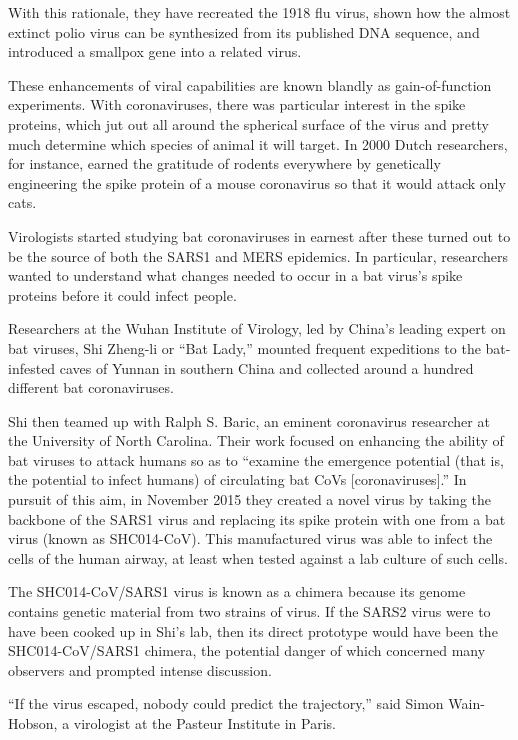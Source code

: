 \documentclass[
]{book}
\begin{document}
With this rationale, they have recreated the 1918 flu virus, shown how the almost extinct polio virus can be synthesized from its published DNA sequence, and introduced a smallpox gene into a related virus.

These enhancements of viral capabilities are known blandly as gain-of-function experiments. With coronaviruses, there was particular interest in the spike proteins, which jut out all around the spherical surface of the virus and pretty much determine which species of animal it will target. In 2000 Dutch researchers, for instance, earned the gratitude of rodents everywhere by genetically engineering the spike protein of a mouse coronavirus so that it would attack only cats.

Virologists started studying bat coronaviruses in earnest after these turned out to be the source of both the SARS1 and MERS epidemics. In particular, researchers wanted to understand what changes needed to occur in a bat virus's spike proteins before it could infect people.

Researchers at the Wuhan Institute of Virology, led by China's leading expert on bat viruses, Shi Zheng-li or ``Bat Lady,'' mounted frequent expeditions to the bat-infested caves of Yunnan in southern China and collected around a hundred different bat coronaviruses.

Shi then teamed up with Ralph S. Baric, an eminent coronavirus researcher at the University of North Carolina. Their work focused on enhancing the ability of bat viruses to attack humans so as to ``examine the emergence potential (that is, the potential to infect humans) of circulating bat CoVs {[}coronaviruses{]}.'' In pursuit of this aim, in November 2015 they created a novel virus by taking the backbone of the SARS1 virus and replacing its spike protein with one from a bat virus (known as SHC014-CoV). This manufactured virus was able to infect the cells of the human airway, at least when tested against a lab culture of such cells.

The SHC014-CoV/SARS1 virus is known as a chimera because its genome contains genetic material from two strains of virus. If the SARS2 virus were to have been cooked up in Shi's lab, then its direct prototype would have been the SHC014-CoV/SARS1 chimera, the potential danger of which concerned many observers and prompted intense discussion.

``If the virus escaped, nobody could predict the trajectory,'' said Simon Wain-Hobson, a virologist at the Pasteur Institute in Paris.
\end{document}
